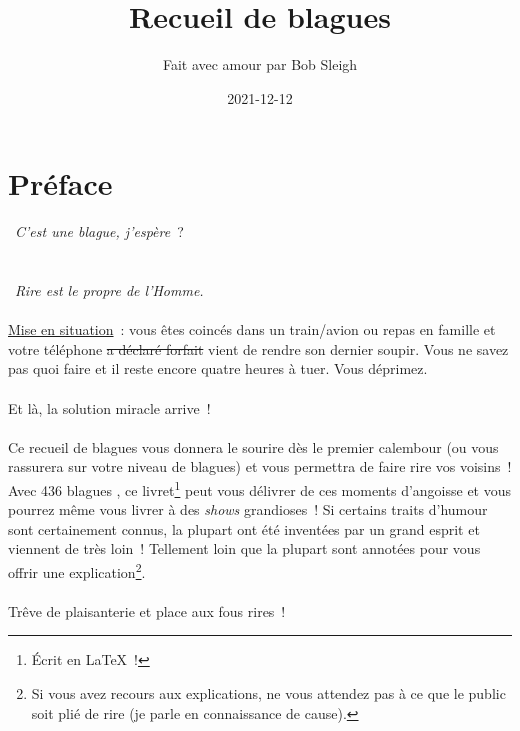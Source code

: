 \documentclass[10pt,a5paper,fullpage]{book}
\title{Recueil de blagues}
\author{Fait avec amour par Bob Sleigh}
\date{2021-12-12}
\begin{document}
	\maketitle
	\thispagestyle{empty}
	\tableofcontents
	\newpage
	\section*{Préface}
	\thispagestyle{plain}
	\guillemotleft~\textit{C'est une blague, j'espère}~?~\guillemotright\\~ \\ \\
	\guillemotleft~\textit{Rire est le propre de l'Homme.}~\guillemotright\\~ \\
	
	\underline{Mise en situation}~: vous êtes coincés dans un train/avion ou repas en famille et votre téléphone \sout{a déclaré forfait} vient de rendre son dernier soupir. Vous ne savez pas quoi faire et il reste encore quatre heures à tuer. Vous déprimez. \\ \\
	Et là, la solution miracle arrive~! \\ \\
	Ce recueil de blagues vous donnera le sourire dès le premier calembour (ou vous rassurera sur votre niveau de blagues) et vous permettra de faire rire vos voisins~! \\Avec 436 blagues%
	, ce livret\footnote{Écrit en \LaTeX~!} peut vous délivrer de ces moments d'angoisse et vous pourrez même vous livrer à des \textit{shows} grandioses~!
	Si certains traits d'humour sont certainement connus, la plupart ont été inventées par un grand esprit et viennent de très loin~! Tellement loin que la plupart sont annotées pour vous offrir une explication\footnote{Si vous avez recours aux explications, ne vous attendez pas à ce que le public soit plié de rire (je parle en connaissance de cause).}. \\ \\
	Trêve de plaisanterie et place aux fous rires~!
	
\end{document}
